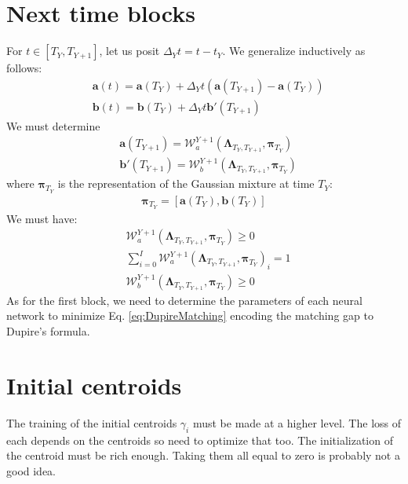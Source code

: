 \documentclass[10pt,a4paper]{article}
\begin{document}
\section{Next time blocks}
For $t\in \left[ T_Y, T_{Y+1}\right]$, let us posit $\Delta_Y t = t - t_Y$. We generalize inductively as follows:
\begin{align}
&\boldsymbol{a}(t) = \boldsymbol{a}(T_Y) + \Delta_Y t (\boldsymbol{a}(T_{Y+1})-\boldsymbol{a}(T_Y)) \\
&\boldsymbol{b}(t) = \boldsymbol{b}(T_Y) + \Delta_Y t \boldsymbol{b}'(T_{Y+1})
\end{align}
We must determine 
\begin{align}
&\boldsymbol{a}(T_{Y+1}) =  \mathcal{W}_a^{Y+1}(\boldsymbol{\Lambda}_{T_Y,T_{Y+1}},\boldsymbol{\pi}_{T_Y}) \\
&\boldsymbol{b}'(T_{Y+1}) =  \mathcal{W}_b^{Y+1}(\boldsymbol{\Lambda}_{T_Y,T_{Y+1}},\boldsymbol{\pi}_{T_Y})
\end{align}
where $\boldsymbol{\pi}_{T_Y}$ is the representation of the Gaussian mixture at time $T_Y$:
\begin{align}
\boldsymbol{\pi}_{T_Y} = \left[\boldsymbol{a}(T_Y),\boldsymbol{b}(T_Y)\right]
\end{align}
We must have:
\begin{align}
&\mathcal{W}_a^{Y+1}(\boldsymbol{\Lambda}_{T_Y,T_{Y+1}},\boldsymbol{\pi}_{T_Y})\geq 0\\
&\sum_{i=0}^I\mathcal{W}_a^{Y+1}(\boldsymbol{\Lambda}_{T_Y,T_{Y+1}},\boldsymbol{\pi}_{T_Y})_i = 1\\
&\mathcal{W}_b^{Y+1}(\boldsymbol{\Lambda}_{T_Y,T_{Y+1}},\boldsymbol{\pi}_{T_Y})\geq 0
\end{align}
As for the first block, we need to determine the parameters of each neural network to minimize Eq. \ref{eq:DupireMatching} encoding the matching gap to Dupire's formula.

\section{Initial centroids}
The training of the initial centroids $\gamma_i$ must be made at a higher level. The loss of each depends on the centroids so need to optimize that too. The initialization of the centroid must be rich enough. Taking them all equal to zero is probably not a good idea.
\end{document}
